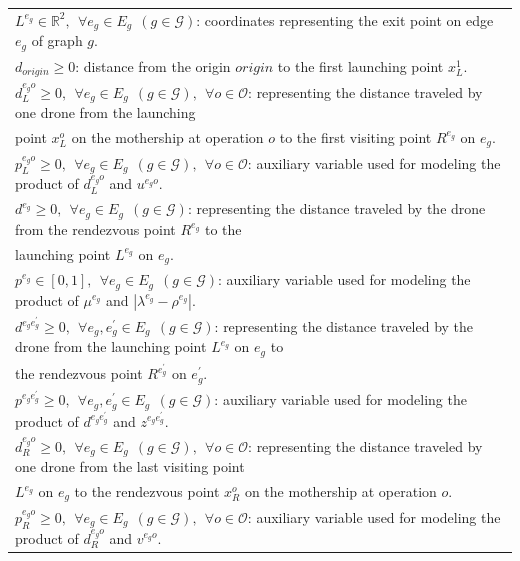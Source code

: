 \documentclass[10pt,a4paper]{elsarticle}
\begin{document}
\begin{table}[h!]
\begin{tabular}{|l|}
	$L^{e_g}\in\mathbb R^2, \:\: \forall e_g \in E_g \:\: (g \in \mathcal{G})$: coordinates representing the exit point on edge $e_g$ of graph $g$.\\
	$d_{origin}\geq 0$: distance from the origin $origin$ to the first launching point $x_L^1$.\\
	$d_L^{e_go} \geq 0, \:\: \forall e_g \in E_g \:\:(g \in \mathcal{G}), \:\:\forall o \in \mathcal O$: representing the distance traveled by one drone from the launching\\
	\hspace*{1cm} point $x_L^o$ on the mothership at operation $o$ to the first visiting point $R^{e_g}$ on $e_g$.\\
	$p_L^{e_go} \geq 0, \:\: \forall e_g \in E_g \:\: (g \in \mathcal{G}), \:\:\forall o \in \mathcal O$: auxiliary variable used for modeling the product of $d_L^{e_go}$ and $u^{e_go}$.\\
	$d^{e_g} \geq 0, \:\: \forall e_g \in E_g \:\: (g \in \mathcal{G})$: representing the distance traveled by the drone from the rendezvous point $R^{e_g}$ to the \\
	\hspace*{1cm} launching point $L^{e_g}$ on $e_g$. \\
	$p^{e_g}\in [0, 1], \:\: \forall e_g \in E_g \:\: (g \in \mathcal G)$: auxiliary variable used for modeling the product of $\mu^{e_g}$ and $|\lambda^{e_g}-\rho^{e_g}|$.\\
	$d^{e_ge^\prime_g} \geq 0, \:\: \forall e_g, e^\prime_g \in E_g \:\:(g \in \mathcal{G})$: representing the distance traveled by the drone from the launching point $L^{e_g}$ on $e_g$ to\\
	\hspace*{1cm}  the rendezvous point $R^{e^\prime_g}$ on $e^\prime_g$.\\
	$p^{e_ge^\prime_g} \geq 0, \:\: \forall e_g, e^\prime_g \in E_g \:\:(g \in \mathcal{G})$: auxiliary variable used for modeling the product of $d^{e_ge^\prime_g}$ and $z^{e_ge^\prime_g}$.\\
	$d_R^{e_go} \geq 0, \:\: \forall e_g \in E_g \:\:(g \in \mathcal{G}), \:\:\forall o \in \mathcal O$: representing the distance traveled by one drone from the last visiting point\\
	\hspace*{1cm} $L^{e_g}$ on $e_g$ to the rendezvous point $x_R^o$ on the mothership at operation $o$.\\
	$p_R^{e_go} \geq 0, \:\: \forall e_g \in E_g \:\:(g \in \mathcal{G}), \:\:\forall o \in \mathcal O$: auxiliary variable used for modeling the product of $d_R^{e_go}$ and $v^{e_go}$.\\

\end{tabular}
\end{table}
\end{document}
